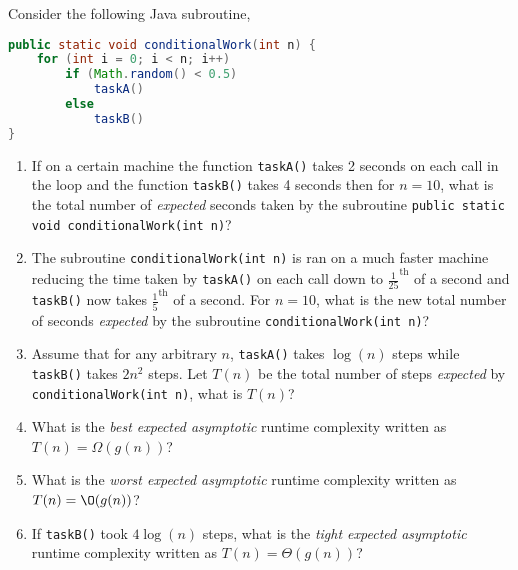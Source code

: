 \documentclass{homework}
\begin{document}
\question Consider the following Java subroutine,
\begin{lstlisting}[language=java]
public static void conditionalWork(int n) {
    for (int i = 0; i < n; i++)
        if (Math.random() < 0.5)
            taskA()
        else
            taskB()
}
\end{lstlisting}
\begin{enumerate}
  \item If on a certain machine the function \texttt{taskA()} takes 2
        seconds on each call in the loop and the function \texttt{taskB()}
        takes 4 seconds then for $n=10$, what is the total number of
        \textit{expected} seconds taken by the subroutine \texttt{public
          static void conditionalWork(int n)}?


  \item The subroutine \texttt{conditionalWork(int n)} is ran on a much
        faster machine reducing the time taken by \texttt{taskA()} on each
        call down to $\frac{1}{25}^\text{th}$ of a second and
        \texttt{taskB()} now takes $\frac{1}{5}^\text{th}$ of a second.
        For ${n=10}$, what is the new total number of seconds
        \textit{expected} by the subroutine \texttt{conditionalWork(int
          n)}?


  \item Assume that for any arbitrary $n$, \texttt{taskA()} takes
        $\log(n)$ steps while \texttt{taskB()} takes $2n^2$ steps. Let
        $T(n)$ be the total number of steps \textit{expected} by
        \texttt{conditionalWork(int n)}, what is $T(n)$?


  \item What is the \textit{best expected asymptotic} runtime complexity
        written as $T(n) = \Omega(g(n))$?


  \item What is the \textit{worst expected asymptotic} runtime complexity
        written as $T(n) = \O(g(n))$?


  \item If \texttt{taskB()} took $4\log(n)$ steps, what is the
        \textit{tight expected asymptotic} runtime complexity written as
        $T(n) = \Theta(g(n))$?

\end{enumerate}
\end{document}
